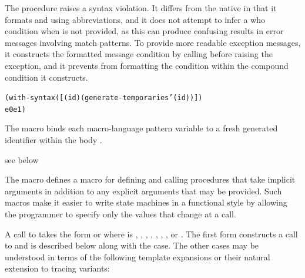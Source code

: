 The  procedure raises a syntax violation.
It differs from the native  in that it formats
 and  using  abbreviations,
and it does not attempt to infer a who condition when  is not
provided, as this can produce confusing results in error messages
involving match patterns.
To provide more readable exception messages, it constructs the formatted
message condition by calling  before raising the exception,
and it prevents  from formatting the 
condition within the compound condition it constructs.

\begin{syntax}
\end{syntax}
\expandsto{}\begin{alltt}\antipar
(with-syntax ([(id \etc) (generate-temporaries '(id \etc))])
  e0 e1 \etc)\end{alltt}

The  macro binds each macro-language
pattern variable  to a fresh generated identifier
within the body .

\begin{syntax}
\end{syntax}
\expandsto{} see below

The  macro defines a macro  for defining
and calling procedures that take implicit  arguments in addition
to any explicit arguments that may be provided.
Such macros make it easier to write state machines in a functional style
by allowing the programmer to specify only the values that change at a call.

A call to  takes the form
or
where  is
,
,
,
,
,
,
, or
.
The first form constructs a call to  and is described below
along with the  case.
The other cases may be understood in terms of the following template
expansions or their natural extension to tracing variants:

